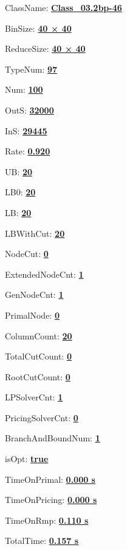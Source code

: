 \documentclass[11pt]{article}
\begin{document}
\pagestyle{empty}


ClassName: \underline{\textbf{Class_03.2bp-46}}
\par
BinSize: \underline{\textbf{40 × 40}}
\par
ReduceSize: \underline{\textbf{40 × 40}}
\par
TypeNum: \underline{\textbf{97}}
\par
Num: \underline{\textbf{100}}
\par
OutS: \underline{\textbf{32000}}
\par
InS: \underline{\textbf{29445}}
\par
Rate: \underline{\textbf{0.920}}
\par
UB: \underline{\textbf{20}}
\par
LB0: \underline{\textbf{20}}
\par
LB: \underline{\textbf{20}}
\par
LBWithCut: \underline{\textbf{20}}
\par
NodeCut: \underline{\textbf{0}}
\par
ExtendedNodeCnt: \underline{\textbf{1}}
\par
GenNodeCnt: \underline{\textbf{1}}
\par
PrimalNode: \underline{\textbf{0}}
\par
ColumnCount: \underline{\textbf{20}}
\par
TotalCutCount: \underline{\textbf{0}}
\par
RootCutCount: \underline{\textbf{0}}
\par
LPSolverCnt: \underline{\textbf{1}}
\par
PricingSolverCnt: \underline{\textbf{0}}
\par
BranchAndBoundNum: \underline{\textbf{1}}
\par
isOpt: \underline{\textbf{true}}
\par
TimeOnPrimal: \underline{\textbf{0.000 s}}
\par
TimeOnPricing: \underline{\textbf{0.000 s}}
\par
TimeOnRmp: \underline{\textbf{0.110 s}}
\par
TotalTime: \underline{\textbf{0.157 s}}
\par
\newpage


\end{document}
